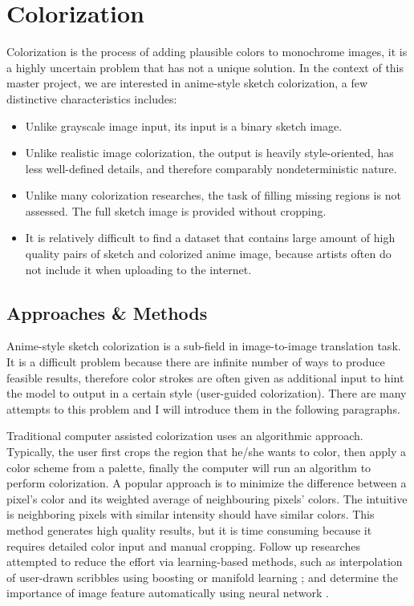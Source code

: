 \chapter{Colorization}
\label{chapterlabel3}

Colorization is the process of adding plausible colors to monochrome images, it is a highly uncertain problem that has not a unique solution. In the context of this master project, we are interested in anime-style sketch colorization, a few distinctive characteristics includes:

\begin{itemize}
    \item Unlike grayscale image input, its input is a binary sketch image.
    \item Unlike realistic image colorization, the output is heavily style-oriented, has less well-defined details, and therefore comparably nondeterministic nature.
    \item Unlike many colorization researches, the task of filling missing regions is not assessed. The full sketch image is provided without cropping.
    \item It is relatively difficult to find a dataset that contains large amount of high quality pairs of sketch and colorized anime image, because artists often do not include it when uploading to the internet.
\end{itemize}


\section{Approaches \& Methods}
Anime-style sketch colorization is a sub-field in image-to-image translation task. It is a difficult problem because there are infinite number of ways to produce feasible results, therefore color strokes are often given as additional input to hint the model to output in a certain style (user-guided colorization). There are many attempts to this problem and I will introduce them in the following paragraphs.

Traditional computer assisted colorization uses an algorithmic approach. Typically, the user first crops the region that he/she wants to color, then apply a color scheme from a palette, finally the computer will run an algorithm to perform colorization. A popular approach is to minimize the difference between a pixel's color and its weighted average of neighbouring pixels' colors.\cite{levinColorizationUsingOptimizationb} The intuitive is neighboring pixels with similar intensity should have similar colors. This method generates high quality results, but it is time consuming because it requires detailed color input and manual cropping. Follow up researches attempted to reduce the effort via learning-based methods, such as interpolation of user-drawn scribbles using boosting \cite{liScribbleBoostAddingClassification2008} or manifold learning \cite{chenManifoldPreservingEdit2012}; and determine the importance of image feature automatically using neural network \cite{endoDeepPropExtractingDeep2016}.


